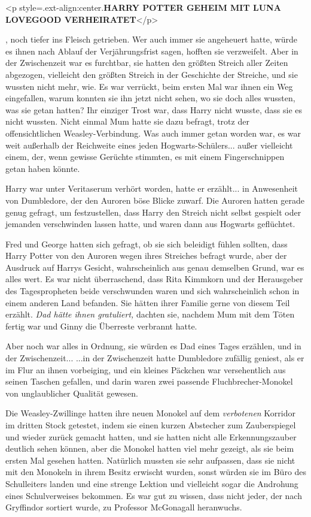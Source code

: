 <p style=\grqq{}.ext-align:center\grqq{}.\textbf{HARRY POTTER GEHEIM MIT LUNA
LOVEGOOD VERHEIRATET}</p>

, noch tiefer ins Fleisch getrieben. Wer auch immer sie angeheuert hatte, würde
es ihnen nach Ablauf der Verjährungsfrist sagen, hofften sie verzweifelt. Aber
in der Zwischenzeit war es furchtbar, sie hatten den größten Streich aller
Zeiten abgezogen, vielleicht den größten Streich in der Geschichte der Streiche,
und sie wussten nicht mehr, wie. Es war verrückt, beim ersten Mal war ihnen ein
Weg eingefallen, warum konnten sie ihn jetzt nicht sehen, wo sie doch alles
wussten, was sie getan hatten? Ihr einziger Trost war, dass Harry nicht wusste,
dass sie es nicht wussten. Nicht einmal Mum hatte sie dazu befragt, trotz der
offensichtlichen Weasley-Verbindung. Was auch immer getan worden war, es war
weit außerhalb der Reichweite eines jeden Hogwarts-Schülers... außer vielleicht
einem, der, wenn gewisse Gerüchte stimmten, es mit einem Fingerschnippen getan
haben könnte.

Harry war unter Veritaserum verhört worden, hatte er erzählt... in Anwesenheit
von Dumbledore, der den Auroren böse Blicke zuwarf. Die Auroren hatten gerade
genug gefragt, um festzustellen, dass Harry den Streich nicht selbst gespielt
oder jemanden verschwinden lassen hatte, und waren dann aus Hogwarts geflüchtet.

Fred und George hatten sich gefragt, ob sie sich beleidigt fühlen sollten, dass
Harry Potter von den Auroren wegen ihres Streiches befragt wurde, aber der
Ausdruck auf Harrys Gesicht, wahrscheinlich aus genau demselben Grund, war es
alles wert. Es war nicht überraschend, dass Rita Kimmkorn und der Herausgeber
des Tagespropheten beide verschwunden waren und sich wahrscheinlich schon in
einem anderen Land befanden. Sie hätten ihrer Familie gerne von diesem Teil
erzählt. \emph{Dad hätte ihnen gratuliert,} dachten sie, nachdem Mum mit dem
Töten fertig war und Ginny die Überreste verbrannt hatte.

Aber noch war alles in Ordnung, sie würden es Dad eines Tages erzählen, und in
der Zwischenzeit... ...in der Zwischenzeit hatte Dumbledore zufällig geniest,
als er im Flur an ihnen vorbeiging, und ein kleines Päckchen war versehentlich
aus seinen Taschen gefallen, und darin waren zwei passende Fluchbrecher-Monokel
von unglaublicher Qualität gewesen.

Die Weasley-Zwillinge hatten ihre neuen Monokel auf dem \glqq
\emph{verbotenen}\grqq{} Korridor im dritten Stock getestet, indem sie einen
kurzen Abstecher zum Zauberspiegel und wieder zurück gemacht hatten, und sie
hatten nicht alle Erkennungszauber deutlich sehen können, aber die Monokel
hatten viel mehr gezeigt, als sie beim ersten Mal gesehen hatten. Natürlich
mussten sie sehr aufpassen, dass sie nicht mit den Monokeln in ihrem Besitz
erwischt wurden, sonst würden sie im Büro des Schulleiters landen und eine
strenge Lektion und vielleicht sogar die Androhung eines Schulverweises
bekommen. Es war gut zu wissen, dass nicht jeder, der nach Gryffindor sortiert
wurde, zu Professor McGonagall heranwuchs.

